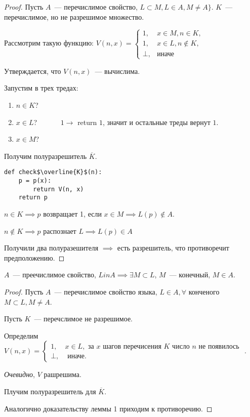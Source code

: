 \begin{proof}
    Пусть $A$~--- перечислимое свойство, $L \subset M, L \in A, M \neq A\}$.
    $K$~--- перечислимое, но не разрешимое множество.

    Рассмотрим такую функцию:
    $V(n, x) = \begin{cases}
         1, &x \in M, n \in K,\\
         1, &x \in L, n \not\in K,\\
         \bot, &\text{иначе}
    \end{cases}$

    Утверждается, что $V(n, x)$~--- вычислима.

    Запустим в трех тредах:
    \begin{enumerate}
        \item $n \in K$?
        \item $x \in L$?~~~~~~ $1 \to $ return $1$, значит и остальные треды вернут $1$.
        \item $x \in M$?
    \end{enumerate}

    Получим полуразрешитель $\overline{K}$.

\begin{lstlisting}[mathescape=true]
def check$\overline{K}$(n):
    p = p(x):
        return V(n, x)
    return p
\end{lstlisting}

$n \in K \implies p$ возвращает 1, если $x \in M \implies L(p) \not\in A$.

$n \not\in K \implies p$ распознает $L \implies L(p ) \in A$

Получили два полуразешителя $\implies$ есть разрешитель, что противоречит предположению.
\end{proof}

\begin{lemma}
    $A$~--- преечислимое свойство, $L in A \implies \exists M \subset L $, $M$~--- конечный, $M \in A$.
\end{lemma}

\begin{proof}
    Пусть $A$~--- перечислимое свойство языка, $L \in A, \forall$  конченого $M \subset L, M\neq A$.

    Пусть $K$~--- перечслимое не разрешимое.

    Определим $V(n, x) = \begin{cases}
        1, &x \in L, \text{ за } x \text{ шагов перечисения } K  \text{ число } n  \text{ не появилось }\\
        \bot,& \text{ иначе}.
    \end{cases}$.


\textit{Очевидно}, $V$ рашрешима.

Плучим полуразрешитель для $\overline{K}$.

Аналогично доказательству леммы 1 приходим к противоречию.

\end{proof}

